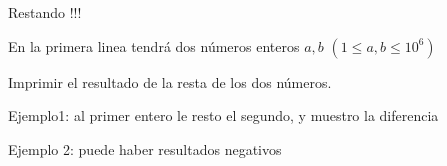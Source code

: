 
Restando !!!
  

En la primera linea tendrá dos números enteros $a,b$ $(1\leq a,b \leq 10^6)$

\outputText

Imprimir el resultado de la resta de los dos números.

\exampleCases

\begin{example}
\end{example}

\explanationText

Ejemplo1: al primer entero le resto el segundo, y muestro la diferencia

Ejemplo 2: puede haber resultados negativos
